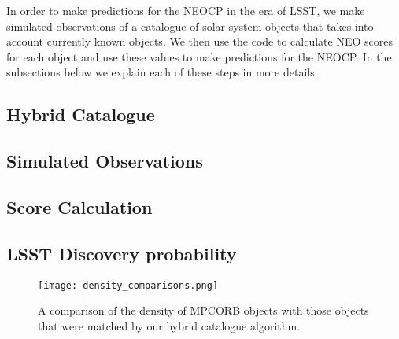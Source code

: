In order to make predictions for the NEOCP in the era of LSST, we make simulated observations of a catalogue of solar system objects that takes into account currently known objects. We then use the \dig{} code to calculate NEO scores for each object and use these values to make predictions for the NEOCP. In the subsections below we explain each of these steps in more details.

\subsection{Hybrid Catalogue}
\subsection{Simulated Observations}
\subsection{\dig{} Score Calculation}
\subsection{LSST Discovery probability}



\begin{figure}
    \centering
    \texttt{[image: density\_comparisons.png]}
    \caption{A comparison of the density of MPCORB objects with those objects that were matched by our hybrid catalogue algorithm.}
\end{figure}